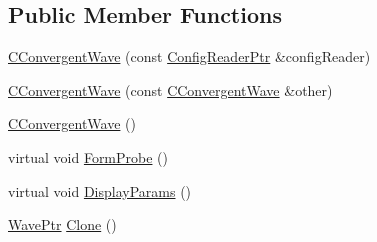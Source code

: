\subsection*{Public Member Functions}
\begin{DoxyCompactItemize}
\item 
\hyperlink{class_q_s_t_e_m_1_1_c_convergent_wave_a67a42c52f85b688ef7cf50b24d1c3969}{C\-Convergent\-Wave} (const \hyperlink{namespace_q_s_t_e_m_af9424707fe9f6503298f49b41304bd35}{Config\-Reader\-Ptr} \&config\-Reader)
\item 
\hyperlink{class_q_s_t_e_m_1_1_c_convergent_wave_a2f68171fdbc83aedbdb6ad123b45cc4a}{C\-Convergent\-Wave} (const \hyperlink{class_q_s_t_e_m_1_1_c_convergent_wave}{C\-Convergent\-Wave} \&other)
\item 
\hyperlink{class_q_s_t_e_m_1_1_c_convergent_wave_a34ece45a9c2c0f46587d74cff9465b6c}{C\-Convergent\-Wave} ()
\item 
virtual void \hyperlink{class_q_s_t_e_m_1_1_c_convergent_wave_aa6e19da91ff3f4d783fca3bd87fc96a5}{Form\-Probe} ()
\item 
virtual void \hyperlink{class_q_s_t_e_m_1_1_c_convergent_wave_acff347f02f2a0405efa296cf5621fdcd}{Display\-Params} ()
\item 
\hyperlink{namespace_q_s_t_e_m_ab42c5fe058973736465964e84b504b74}{Wave\-Ptr} \hyperlink{class_q_s_t_e_m_1_1_c_convergent_wave_ac016ccfb59dcea273518da50667ec746}{Clone} ()
\end{DoxyCompactItemize}
